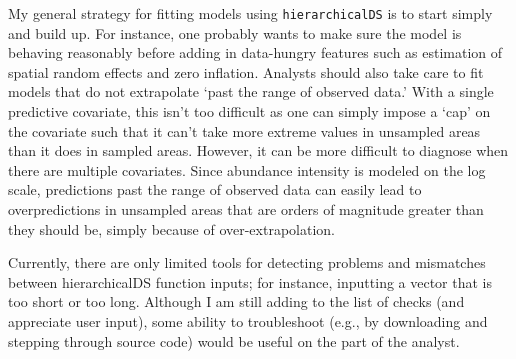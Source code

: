 \documentclass{article}\usepackage{graphicx, color}
\begin{document}
My general strategy for fitting models using \texttt{hierarchicalDS} is to start simply and build up.  For instance, one probably wants to make sure the model is behaving reasonably before adding in data-hungry features such as estimation of spatial random effects and zero inflation.  Analysts should also take care to fit models that do not extrapolate `past the range of observed data.'  With a single predictive covariate, this isn't too difficult as one can simply impose a `cap' on the covariate such that it can't take more extreme values in unsampled areas than it does in sampled areas.  However, it can be more difficult to diagnose when there are multiple covariates.  Since abundance intensity is modeled on the log scale, predictions past the range of observed data can easily lead to overpredictions in unsampled areas that are orders of magnitude greater than they should be, simply because of over-extrapolation.

Currently, there are only limited tools for detecting problems and mismatches between hierarchicalDS function inputs; for instance, inputting a vector that is too short or too long.  Although I am still adding to the list of checks (and appreciate user input), some ability to troubleshoot (e.g., by downloading and stepping through source code) would be useful on the part of the analyst. 



\end{document}
